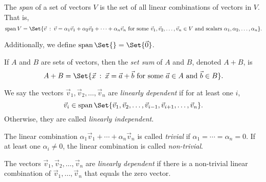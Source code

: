 \begin{SaveDefinition}[key=Span, title={Span}]
	The
	\emph{span} of a set of vectors $V$ is the set of all linear
	combinations of vectors in $V$. That is,
	\[
		\Span V = \Set{\vec v \given \vec v=\alpha_1\vec v_1+\alpha_2\vec
		v_2 + \cdots +\alpha_n\vec v_n\text{ for some }\vec v_1,\vec v_2,\ldots,\vec
		v_n\in V \text{ and scalars }\alpha_1,\alpha_2,\ldots,\alpha_n}.
	\]

	Additionally, we define $\Span\Set{} = \Set{\vec 0}$.
\end{SaveDefinition}

\begin{SaveDefinition}[key=SetAddition, title={Set Addition}]
	If $A$ and $B$ are sets of vectors, then the
	\emph{set sum} of $A$ and $B$, denoted $A+B$, is
	\[
		A+B=\Set{\vec x \given \vec x=\vec a+\vec b\text{ for some }\vec
		a\in A\text{ and } \vec b\in B}.
	\]

\end{SaveDefinition}

\begin{SaveDefinition}[
	key=LinearlyDependentIndependentGeometric,
	title={Linearly Dependent \& Independent (Geometric)}]

	We say the vectors $\vec v_{1},\vec v_{2},\ldots,\vec v_{n}$ are
	\emph{linearly dependent} if for at least one $i$,
	\[
		\vec v_{i}\in\Span\Set{\vec v_1,\vec v_2,\ldots,\vec v_{i-1}, \vec
		v_{i+1},\ldots,\vec v_n}.
	\]
	 Otherwise, they are called
	\emph{linearly independent}.
\end{SaveDefinition}

\begin{SaveDefinition}[
	key=TrivialLinearCombination,
	title={Trivial Linear Combination}]

	The linear combination $\alpha_1\vec v_1+\cdots+\alpha_n\vec v_n$ is called
	\emph{trivial}
	if $\alpha_1=\cdots=\alpha_n=0$. If at least one $\alpha_i\neq 0$,
	the linear combination is called \emph{non-trivial}.
\end{SaveDefinition}

\begin{SaveDefinition}[
	key=LinearlyDependentIndependentAlgebraic,
	title={Linearly Dependent \& Independent (Algebraic)}]

	The vectors $\vec v_{1},\vec v_{2},\ldots,\vec v_{n}$ are
	\emph{linearly dependent} if there is a non-trivial linear combination
	of $\vec v_{1},\ldots,\vec v_{n}$ that equals the zero vector.
\end{SaveDefinition}

